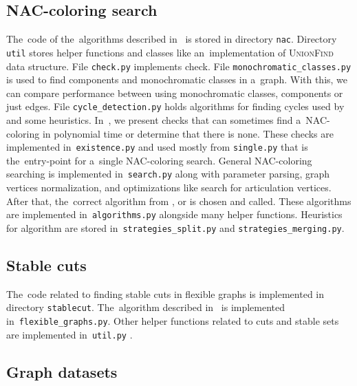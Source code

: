 \subsection{NAC-coloring search}

The~code of the~algorithms described in~
is stored in directory \texttt{nac}.
%
Directory \texttt{util} stores helper functions and classes
like an~implementation of \textsc{UnionFind} data structure.
%
File \texttt{check.py} implements \IsNACColoring{} check.
%
File \texttt{monochromatic\_classes.py} is used to find \trcon{} components
and monochromatic classes in a~graph. With this, we can compare performance
between using monochromatic classes, \trcon{} components or just edges.
%
File \texttt{cycle\_detection.py} holds algorithms for finding cycles
used by 
and some heuristics.
%
In~,
we present checks that can
sometimes find a~NAC-coloring in polynomial time
or determine that there is none.
These checks are implemented in~\texttt{existence.py} and
used mostly from \texttt{single.py} that is the~entry-point
for a~single NAC-coloring search.
%
General NAC-coloring searching is implemented in~\texttt{search.py}
along with parameter parsing, graph vertices normalization, and
optimizations like search for articulation vertices.
After that, the~correct algorithm from \Naive{}, \NaiveCycles{} or \Subgraphs{}
is chosen and called.
%
These algorithms are implemented in~\texttt{algorithms.py} alongside many helper functions.
Heuristics for \Subgraphs{} algorithm are stored in~\texttt{strategies\_split.py}
and \texttt{strategies\_merging.py}.


\subsection{Stable cuts}

The~code related to finding stable cuts in flexible graphs
is implemented in directory \texttt{stablecut}.
%
The~algorithm described in~
is implemented in~\texttt{flexible\_graphs.py}.
Other helper functions related to cuts and stable sets
are implemented in~\texttt{util.py}%
.


\subsection{Graph datasets}

